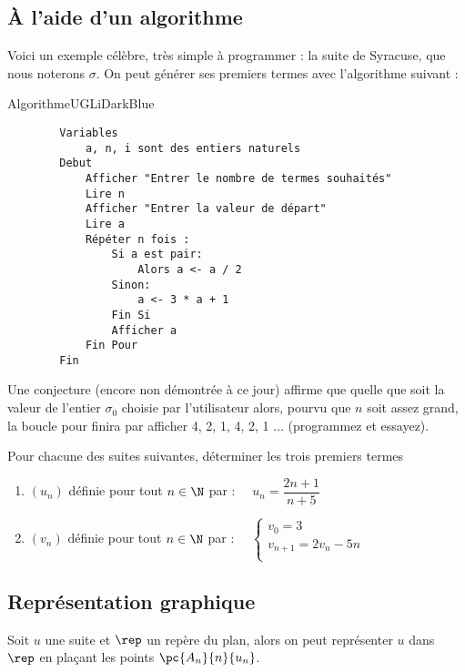 \documentclass[a4paper,11pt,cours]{nsi} %
\begin{document}
\subsection{À l'aide d'un algorithme}
Voici un exemple célèbre, très simple à programmer : la suite de Syracuse, que nous noterons $\sigma$. On peut générer ses premiers termes avec l'algorithme suivant :

\begin{encadrecolore}{Algorithme}{UGLiDarkBlue}
	\begin{verbatim}
		Variables
			a, n, i sont des entiers naturels
		Debut
			Afficher "Entrer le nombre de termes souhaités"
			Lire n
			Afficher "Entrer la valeur de départ"
			Lire a
			Répéter n fois :
				Si a est pair:
				 	Alors a <- a / 2
				Sinon:
				 	a <- 3 * a + 1
				Fin Si
				Afficher a
			Fin Pour
		Fin
	\end{verbatim}	
\end{encadrecolore}




Une conjecture (encore non démontrée à ce jour) affirme que quelle que soit la valeur de l'entier $\sigma_0$ choisie par l'utilisateur 
alors,
pourvu que $n$ soit assez grand, la boucle pour
finira par afficher 4, 2, 1, 4, 2, 1 $\ldots$ (programmez et essayez).

\begin{exercice}[ ]
	Pour chacune des suites suivantes, déterminer les trois premiers termes
	\begin{enumerate}
		\item 	$(u_n)$ définie pour tout $n \in \N$ par : $\quad u_n=\dfrac{2n+1}{n+5}$ \\[0.5em]
		\item 	$(v_n)$ définie pour tout $n \in \N$ par : $\quad \left\{
		\begin{array}{l}
			v_0=3\\ 
			v_{n+1}=2v_n-5n\\
		\end{array} \right.$\\[0.5em]
	\end{enumerate}
\end{exercice}

\subsection{Représentation graphique}
Soit $u$ une suite et $\rep$ un repère du plan, alors on peut représenter $u$ dans $\rep$ en plaçant les points $\pc{A_n}{n}{u_n}$.
\begin{center}
	\def\xmin{-1} \def\ymin{-1}\def\xmax{7}\def\ymax{7}
\end{center}
\end{document}
